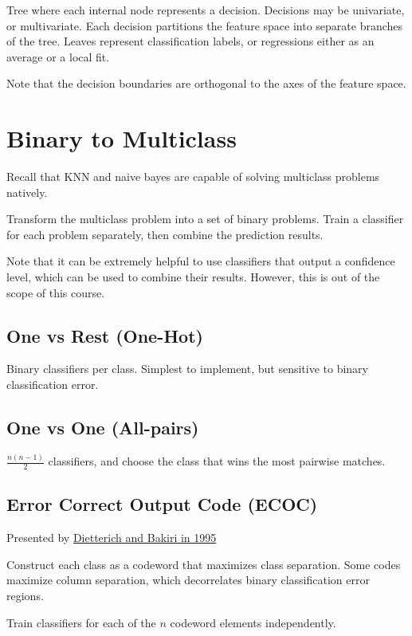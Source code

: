 \documentclass{idc_msc}
\begin{document}
Tree where each internal node represents a decision.
Decisions may be univariate, or multivariate.
Each decision partitions the feature space into separate branches of the tree.
Leaves represent classification labels, or regressions either as an average or a local fit.

Note that the decision boundaries are orthogonal to the axes of the feature space.

\section{Binary to Multiclass}

Recall that KNN and naive bayes are capable of solving multiclass problems natively.

Transform the multiclass problem into a set of binary problems.
Train a classifier for each problem separately, then combine the prediction results.

Note that it can be extremely helpful to use classifiers that output a confidence level, which can be used to combine their results.
However, this is out of the scope of this course.

\subsection{One vs Rest (One-Hot)}

Binary classifiers per class.
Simplest to implement, but sensitive to binary classification error.

\subsection{One vs One (All-pairs)}

\(\frac{n(n-1)}{2}\) classifiers, and choose the class that wins the most pairwise matches.

\subsection{Error Correct Output Code (ECOC)}

Presented by \href{http://www.jair.org/papers/paper105.html}{Dietterich and Bakiri in 1995}

Construct each class as a codeword that maximizes class separation.
Some codes maximize column separation, which decorrelates binary classification error regions.

Train classifiers for each of the \(n\) codeword elements independently.
\end{document}
